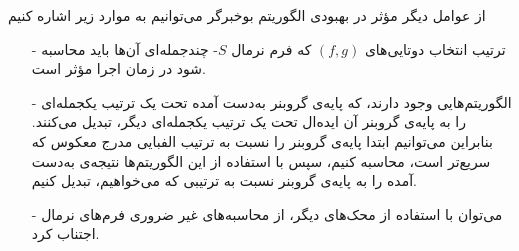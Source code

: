 از عوامل دیگر مؤثر در بهبودی الگوریتم بوخبرگر می‌توانیم به موارد زیر اشاره کنیم
\begin{itemize}
\item[-]
ترتیب انتخاب دوتایی‌های 
$(f, g)$
که فرم نرمال 
$S$-
چندجمله‌ای آن‌ها باید محاسبه شود در زمان اجرا مؤثر است. 
\item[-]
الگوریتم‌هایی وجود دارند،
\cite{faugere1993efficient, collart1997converting}
که پایه‌ی گروبنر به‌دست  آمده تحت یک ترتیب یکجمله‌ای را به پایه‌ی گروبنر آن ایده‌ال تحت یک ترتیب یکجمله‌ای دیگر، تبدیل می‌کنند. بنابراین می‌توانیم ابتدا پایه‌ی گروبنر را نسبت به ترتیب الفبایی مدرج معکوس که سریع‌تر است، محاسبه کنیم، سپس با استفاده از این الگوریتم‌ها نتیجه‌ی به‌دست  آمده را به پایه‌ی گروبنر نسبت به ترتیبی که می‌خواهیم، تبدیل کنیم.
\item[-]
می‌توان با استفاده از محک‌های دیگر، از محاسبه‌های غیر ضروری فرم‌های نرمال اجتناب کرد.
\end{itemize}
%

